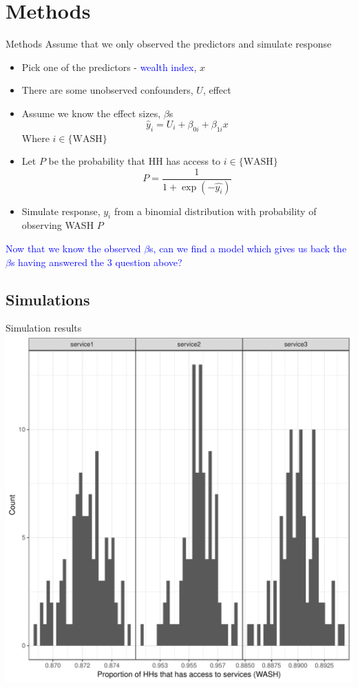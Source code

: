 \documentclass{beamer}
\begin{document}
\section{Methods}
\begin{frame}{Methods}
Assume that we only observed the predictors and simulate response
\begin{itemize}[<+->]
\item Pick one of the predictors - \textcolor{blue}{wealth index}, $x$
\item There are some unobserved confounders, $U$, effect
\item Assume we know the effect sizes, $\beta$s
\pause
\[
\hat{y}_i = U_i + \beta_{0i} + \beta_{1i}x
\]
Where $i\in\{\text{WASH}\}$
\item Let $P$ be the probability that HH has access to $i\in\{\text{WASH}\}$
\[
P = \frac{1}{1 + \exp{(-\hat{y_i})}}
\]
\item Simulate response, $y_i$ from a binomial distribution with probability of observing WASH $P$
\end{itemize}
\pause
\textcolor{blue}{Now that we know the observed $\beta$s, can we find a model which gives us back the $\beta$s having answered the 3 question above?}
\end{frame}

\subsection{Simulations}
\begin{frame}{Simulation results}
\centering
\includegraphics[scale=0.4]{git_push/prop_plot.pdf}
\end{frame}
\end{document}
